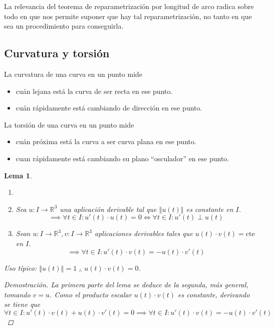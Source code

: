 \documentclass[12pt]{article}
\theoremstyle{plain}
\newtheorem{lem}{Lema}[subsection]
\newenvironment{dem}[1][]{%
  \begin{adjustwidth}{1cm}{0cm} \begin{proof}[Demostración\ifx\relax#1\relax\else{ (#1)}\fi]
}{\end{proof}\end{adjustwidth}}
\newcommand{\R}{\mathbb{R}}
\newcommand{\norm}[1]{\left\Vert#1\right\Vert}
\newcommand{\appl}[3]{#1 \colon #2 \longrightarrow #3}
\newcommand{\we}{\; _{\wedge} \;}
\newcommand{\tex}[1]{\text{#1}}
\renewcommand{\norm}[1]{\left\Vert#1\right\Vert}
\begin{document}
La relevancia del teorema de reparametrización por longitud de arco radica sobre todo en que nos permite suponer que hay tal reparametrización, no tanto en que sea un procedimiento para conseguirla.

\subsection{Curvatura y torsión}
La curvatura de una curva en un punto mide
\begin{itemize}[topsep=1pt, itemsep=1pt,parsep=3pt]
    \item cuán lejana está la curva de ser recta en ese punto.
    \item cuán rápidamente está cambiando de dirección en ese punto.
\end{itemize}
La torsión de una curva en un punto mide
\begin{itemize}[topsep=1pt, itemsep=1pt,parsep=3pt]
    \item cuán próxima está la curva a ser curva plana en ese punto.
    \item cuan rápidamente está cambiando su plano “osculador” en ese punto.
\end{itemize}
\vspace{0.4cm}
\begin{lem}
    \begin{enumerate}[topsep=0pt, itemsep=1pt,parsep=3pt]
        \item[] 
        \item Sea $\appl{u}{I}{\R^3}$ una aplicación derivable tal que $\norm{u(t)}$ es constante en $I$.
        \[\implies \forall t \in I : u'(t)\cdot u(t)=0 \iff \forall t \in I : u'(t) \perp u(t)\]
        \item Sean $\appl{u}{I}{\R^3}, \appl{v}{I}{\R^3}$ aplicaciones derivables tales que $u(t)\cdot v(t)=\tex{cte}$ en $I$.
        \[\implies \forall t \in I : u'(t) \cdot v(t)=-u(t)\cdot v'(t)\]
    \end{enumerate}
    Uso típico: $\norm{u(t)}=1 \we u(t)\cdot v(t)=0$.
    \begin{dem}
        La primera parte del lema se deduce de la segunda, más general, tomando $v=u$.
        Como el producto escalar $u(t)\cdot v(t)$ es constante, derivando se tiene que
        \[\forall t \in I : u'(t)\cdot v(t) + u(t)\cdot v'(t) = 0 \implies \forall t \in I : u'(t)\cdot v(t) = - u(t)\cdot v'(t)\]
    \end{dem}
\end{lem}
\end{document}
